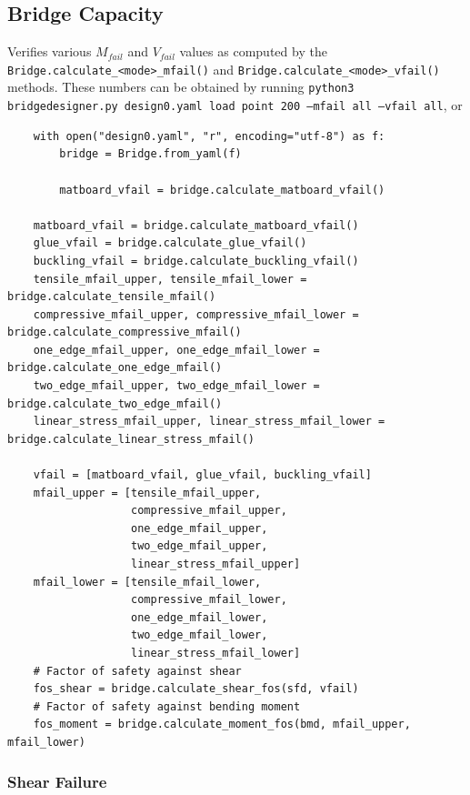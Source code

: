 \documentclass{article}
\begin{document}
\subsection{Bridge Capacity}

Verifies various \(M_{fail}\) and \(V_{fail}\) values as computed by the \texttt{Bridge.calculate_<mode>_mfail()}
and \texttt{Bridge.calculate_<mode>_vfail()} methods. These numbers can be obtained by running
\texttt{python3 bridgedesigner.py design0.yaml load point 200 --mfail all --vfail all}, or
\begin{verbatim}
    with open("design0.yaml", "r", encoding="utf-8") as f:
        bridge = Bridge.from_yaml(f)
    
        matboard_vfail = bridge.calculate_matboard_vfail()
    
    matboard_vfail = bridge.calculate_matboard_vfail()
    glue_vfail = bridge.calculate_glue_vfail()
    buckling_vfail = bridge.calculate_buckling_vfail()
    tensile_mfail_upper, tensile_mfail_lower = bridge.calculate_tensile_mfail()
    compressive_mfail_upper, compressive_mfail_lower = bridge.calculate_compressive_mfail()
    one_edge_mfail_upper, one_edge_mfail_lower = bridge.calculate_one_edge_mfail()
    two_edge_mfail_upper, two_edge_mfail_lower = bridge.calculate_two_edge_mfail()
    linear_stress_mfail_upper, linear_stress_mfail_lower = bridge.calculate_linear_stress_mfail()

    vfail = [matboard_vfail, glue_vfail, buckling_vfail]
    mfail_upper = [tensile_mfail_upper,
                   compressive_mfail_upper,
                   one_edge_mfail_upper,
                   two_edge_mfail_upper,
                   linear_stress_mfail_upper]
    mfail_lower = [tensile_mfail_lower,
                   compressive_mfail_lower,
                   one_edge_mfail_lower,
                   two_edge_mfail_lower,
                   linear_stress_mfail_lower]
    # Factor of safety against shear
    fos_shear = bridge.calculate_shear_fos(sfd, vfail)
    # Factor of safety against bending moment
    fos_moment = bridge.calculate_moment_fos(bmd, mfail_upper, mfail_lower)
\end{verbatim}

\subsubsection{Shear Failure}
\end{document}
